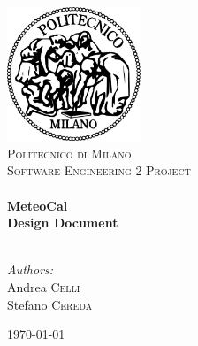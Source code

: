 \begin{titlepage}
\begin{center}

\includegraphics[width=0.30\textwidth]{./images/logo}~\\[1cm]
\textsc{\LARGE Politecnico di Milano}\\[1.5cm]

\textsc{\Large Software Engineering 2 Project}\\[0.5cm]

\HRule \\[0.4cm]
{ \Huge \bfseries MeteoCal \\[0.4cm] }
{ \huge \bfseries Design Document \\[0.4cm] }
\HRule \\[1.5cm]

\begin{flushright}
\noindent
\large
\emph{Authors:}\\
Andrea \textsc{Celli}\\
Stefano \textsc{Cereda}
\end{flushright}
\vfill

{\large \today}

\end{center}
\end{titlepage}